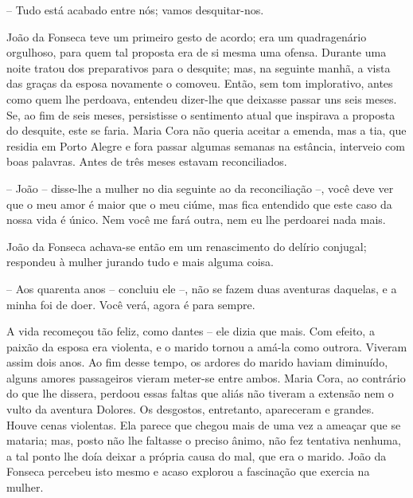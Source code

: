 -- Tudo está acabado entre nós; vamos desquitar-nos.

João da Fonseca teve um primeiro gesto de acordo; era um quadragenário
orgulhoso, para quem tal proposta era de si mesma uma ofensa. Durante
uma noite tratou dos preparativos para o desquite; mas, na seguinte
manhã, a vista das graças da esposa novamente o comoveu. Então, sem tom
implorativo, antes como quem lhe perdoava, entendeu dizer-lhe que
deixasse passar uns seis meses. Se, ao fim de seis meses, persistisse o
sentimento atual que inspirava a proposta do desquite, este se faria.
Maria Cora não queria aceitar a emenda, mas a tia, que residia em Porto
Alegre e fora passar algumas semanas na estância, interveio com boas
palavras. Antes de três meses estavam reconciliados.

-- João -- disse-lhe a mulher no dia seguinte ao da reconciliação --,
você deve ver que o meu amor é maior que o meu ciúme, mas fica entendido
que este caso da nossa vida é único. Nem você me fará outra, nem eu lhe
perdoarei nada mais.

João da Fonseca achava-se então em um renascimento do delírio conjugal;
respondeu à mulher jurando tudo e mais alguma coisa.

-- Aos quarenta anos -- concluiu ele --, não se fazem duas aventuras
daquelas, e a minha foi de doer. Você verá, agora é para sempre.

A vida recomeçou tão feliz, como dantes -- ele dizia que mais. Com
efeito, a paixão da esposa era violenta, e o marido tornou a amá-la como
outrora. Viveram assim dois anos. Ao fim desse tempo, os ardores do
marido haviam diminuído, alguns amores passageiros vieram meter-se entre
ambos. Maria Cora, ao contrário do que lhe dissera, perdoou essas faltas
que aliás não tiveram a extensão nem o vulto da aventura Dolores. Os
desgostos, entretanto, apareceram e grandes. Houve cenas violentas. Ela
parece que chegou mais de uma vez a ameaçar que se mataria; mas, posto
não lhe faltasse o preciso ânimo, não fez tentativa nenhuma, a tal ponto
lhe doía deixar a própria causa do mal, que era o marido. João da
Fonseca percebeu isto mesmo e acaso explorou a fascinação que exercia na
mulher.

